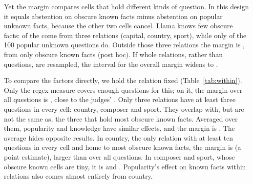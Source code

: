 \documentclass[11pt]{article}
\begin{document}
Yet the margin compares cells that hold different kinds of question. In this design it equals abstention on obscure known facts minus abstention on popular unknown facts, because the other two cells cancel. Llama knows few obscure facts: \rcTopThree{} of the \gsObsKnownTotal{} come from three relations (capital, country, sport), while only \msInUnkN{} of the 100 popular unknown questions do. Outside those three relations the margin is \msOutDiff{} \msOutDiffCI, from only \msOutKnownN{} obscure known facts (post hoc). If whole relations, rather than questions, are resampled, the interval for the overall margin widens to \rcClusCI.

\begin{table}[t]
\centering
\footnotesize\setlength{\tabcolsep}{3pt}
\caption{Holding the relation fixed, regex measure on all \faLlamaN{} labeled questions. All: every relation together. Within: mean over the three relations with at least 3 questions in every cell (country, composer, sport), resampling questions within relation and cell. Post hoc.}
\label{tab:within}
\end{table}

To compare the factors directly, we hold the relation fixed (Table~\ref{tab:within}). Only the regex measure covers enough questions for this; on it, the margin over all questions is \wrPooledPref, close to the judges' \hmLlamaDiff. Only three relations have at least three questions in every cell: country, composer and sport. They overlap with, but are not the same as, the three that hold most obscure known facts. Averaged over them, popularity and knowledge have similar effects, and the margin is \wrPref{} \wrPrefCI. The average hides opposite results. In country, the only relation with at least ten questions in every cell and home to most obscure known facts, the margin is \wrCountry{} (a point estimate), larger than over all questions. In composer and sport, whose obscure known cells are tiny, it is \wrComposer{} and \wrSport. Popularity's effect on known facts within relations also comes almost entirely from country.
\end{document}
